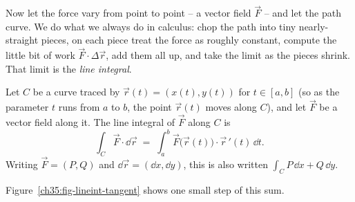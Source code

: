 Now let the force vary from point to point -- a vector field $\vec F$ -- and let
the path curve. We do what we always do in calculus: chop the path into tiny
nearly-straight pieces, on each piece treat the force as roughly constant, compute
the little bit of work $\vec F\cdot\Delta\vec r$, add them all up, and take the
limit as the pieces shrink. That limit is the \emph{line integral}.

\begin{definition}
\label{ch35:def-lineint}
Let $C$ be a curve traced by $\vec r(t)=(x(t),y(t))$ for $t\in[a,b]$ (so as the
parameter $t$ runs from $a$ to $b$, the point $\vec r(t)$ moves along $C$), and let
$\vec F$ be a vector field along it. The line integral of $\vec F$ along $C$ is
\[
  \int_C \vec F\cdot \dd\vec r
  \;=\; \int_a^b \vec F\big(\vec r(t)\big)\cdot \vec r\,'(t)\,\dd t.
\]
Writing $\vec F=(P,Q)$ and $\dd\vec r = (\dd x,\dd y)$, this is also written
$\displaystyle \int_C P\,\dd x + Q\,\dd y$.
\end{definition}

Figure~\ref{ch35:fig-lineint-tangent} shows one small step of this sum.

